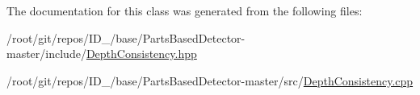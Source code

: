 \-The documentation for this class was generated from the following files\-:\begin{DoxyCompactItemize}
\item 
/root/git/repos/\-I\-D\-\_/base/\-Parts\-Based\-Detector-\/master/include/\hyperlink{DepthConsistency_8hpp}{\-Depth\-Consistency.\-hpp}\item 
/root/git/repos/\-I\-D\-\_/base/\-Parts\-Based\-Detector-\/master/src/\hyperlink{DepthConsistency_8cpp}{\-Depth\-Consistency.\-cpp}\end{DoxyCompactItemize}
